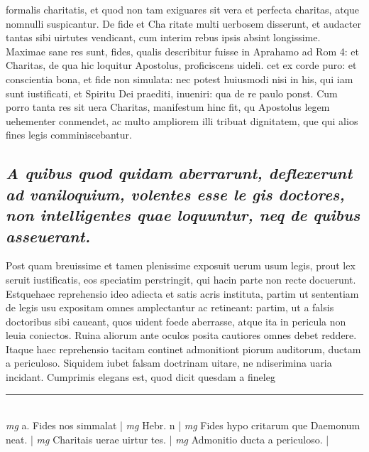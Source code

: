 \documentclass{article}
\begin{document}
\begin{pages}
formalis charitatis, et quod non tam exiguares sit vera et perfecta charitas, atque  nomnulli suspicantur. De fide et Cha ritate multi uerbosem disserunt, et audacter tantas sibi uirtutes vendicant, cum interim rebus ipsis absint longissime. Maximae sane res sunt, fides, qualis describitur fuisse in Aprahamo ad Rom 4: et Charitas, de qua hic loquitur Apostolus, proficiscens uideli. cet ex corde puro: et conscientia bona, et fide non simulata: nec potest huiusmodi nisi in his, qui iam sunt iustificati, et Spiritu Dei praediti, inueniri: qua de re paulo ponst. Cum porro tanta res sit uera Charitas, manifestum hinc fit, qu Apostolus legem uehementer conmendet, ac multo ampliorem illi tribuat dignitatem, que  qui alios fines legis comminiscebantur.  \pend
{}
{}
\subsection*{\textit{A quibus quod quidam aberrarunt, deflexerunt ad vaniloquium, volentes esse le gis doctores, non intelligentes quae loquuntur, neq de quibus asseuerant. }}\pstart Post quam breuissime et tamen plenissime exposuit uerum usum legis, prout lex seruit iustificatis, eos speciatim perstringit, qui hacin parte non recte docuerunt. Estquehaec reprehensio ideo adiecta et satis acris instituta, partim ut sententiam de legis usu expositam omnes amplectantur ac retineant: partim, ut a falsis doctoribus sibi caueant, quos uident foede aberrasse, atque  ita in pericula non leuia coniectos. Ruina aliorum ante oculos posita cautiores omnes debet reddere. Itaque  haec reprehensio tacitam continet admonitiont piorum auditorum, ductam a periculoso. Siquidem iubet falsam doctrinam uitare, ne ndiserimina uaria incidant. Cumprimis elegans est, quod dicit quesdam a fineleg  \pend
\vspace{0.5cm}\noindent
\vspace{0.2cm}\rule{1cm}{0.2pt}\\ 
\hspace{0.2cm}\textit{mg}
\footnotesize a. Fides nos simmalat
\normalsize| 
\hspace{0.2cm}\textit{mg}
\footnotesize Hebr. n 
\normalsize| 
\hspace{0.2cm}\textit{mg}
\footnotesize Fides hypo critarum que  Daemonum neat. 
\normalsize| 
\hspace{0.2cm}\textit{mg}
\footnotesize Charitais uerae uirtur tes. 
\normalsize| 
\hspace{0.2cm}\textit{mg}
\footnotesize Admonitio ducta a periculoso. 
\normalsize| 

\end{pages}
\end{document}
